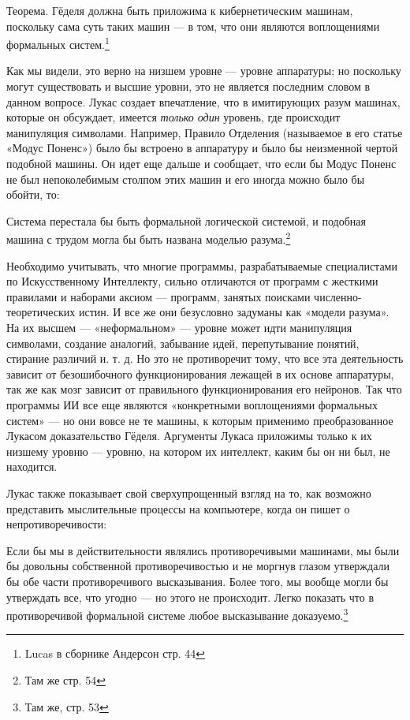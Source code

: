 \documentclass[../main.tex]{subfiles}
\begin{document}
Теорема. Гёделя должна быть приложима к кибернетическим машинам, поскольку сама суть таких машин --- в том, что они являются воплощениями формальных систем.\footnote{Lucas в сборнике Андерсон стр. 44}

Как мы видели, это верно на низшем уровне --- уровне аппаратуры; но поскольку могут существовать и высшие уровни, это не является последним словом в данном вопросе. Лукас создает впечатление, что в имитирующих разум машинах, которые он обсуждает, имеется \emph{только один} уровень, где происходит манипуляция символами. Например, Правило Отделения (называемое в его статье «Модус Поненс») было бы встроено в аппаратуру и было бы неизменной чертой подобной машины. Он идет еще дальше и сообщает, что если бы Модус Поненс не был непоколебимым столпом этих машин и его иногда можно было бы обойти, то:

Система перестала бы быть формальной логической системой, и подобная машина с трудом могла бы быть названа моделью разума.\footnote{Там же стр. 54}

Необходимо учитывать, что многие программы, разрабатываемые специалистами по Искусственному Интеллекту, сильно отличаются от программ с жесткими правилами и наборами аксиом --- программ, занятых поисками численно-теоретических истин. И все же они безусловно задуманы как «модели разума». На их высшем --- «неформальном» --- уровне может идти манипуляция символами, создание аналогий, забывание идей, перепутывание понятий, стирание различий и. т. д. Но это не противоречит тому, что все эта деятельность зависит от безошибочного функционирования лежащей в их основе аппаратуры, так же как мозг зависит от правильного функционирования его нейронов. Так что программы ИИ все еще являются «конкретными воплощениями формальных систем» --- но они вовсе не те машины, к которым применимо преобразованное Лукасом доказательство Гёделя. Аргументы Лукаса приложимы только к их низшему уровню --- уровню, на котором их интеллект, каким бы он ни был, не находится.

Лукас также показывает свой сверхупрощенный взгляд на то, как возможно представить мыслительные процессы на компьютере, когда он пишет о непротиворечивости:

Если бы мы в действительности являлись противоречивыми машинами, мы были бы довольны собственной противоречивостью и не моргнув глазом утверждали бы обе части противоречивого высказывания. Более того, мы вообще могли бы утверждать все, что угодно --- но этого не происходит. Легко показать что в противоречивой формальной системе любое высказывание доказуемо.\footnote{Там же, стр. 53}
\end{document}
